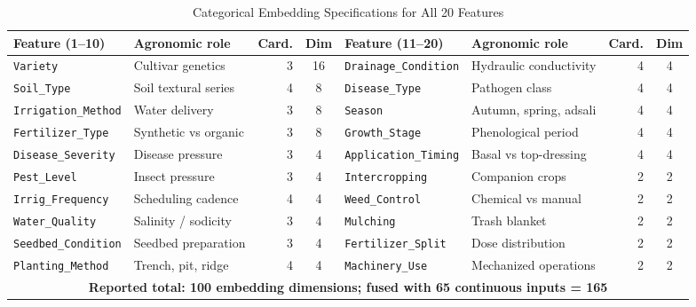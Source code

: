 \documentclass[conference,10pt,letterpaper]{IEEEtran}
\begin{document}
\begin{table}[t]
\caption{Categorical Embedding Specifications for All 20 Features}
\label{tab:embeddings}
\centering
\footnotesize
\setlength{\tabcolsep}{4pt}
\begin{tabular*}{\textwidth}{@{\extracolsep{\fill}}llrc@{\hspace{2em}}llrc@{}}
\toprule
\textbf{Feature (1--10)} & \textbf{Agronomic role} & \textbf{Card.} & \textbf{Dim} &
\textbf{Feature (11--20)} & \textbf{Agronomic role} & \textbf{Card.} & \textbf{Dim} \\
\midrule
\texttt{Variety}            & Cultivar genetics       & 3 & 16 & \texttt{Drainage\_Condition}  & Hydraulic conductivity & 4 & 4 \\
\texttt{Soil\_Type}         & Soil textural series    & 4 & 8  & \texttt{Disease\_Type}        & Pathogen class         & 4 & 4 \\
\texttt{Irrigation\_Method} & Water delivery          & 3 & 8  & \texttt{Season}               & Autumn, spring, adsali & 4 & 4 \\
\texttt{Fertilizer\_Type}   & Synthetic vs organic    & 3 & 8  & \texttt{Growth\_Stage}        & Phenological period    & 4 & 4 \\
\texttt{Disease\_Severity}  & Disease pressure        & 3 & 4  & \texttt{Application\_Timing}  & Basal vs top-dressing  & 4 & 4 \\
\texttt{Pest\_Level}        & Insect pressure         & 3 & 4  & \texttt{Intercropping}        & Companion crops        & 2 & 2 \\
\texttt{Irrig\_Frequency}   & Scheduling cadence      & 4 & 4  & \texttt{Weed\_Control}        & Chemical vs manual     & 2 & 2 \\
\texttt{Water\_Quality}     & Salinity / sodicity     & 3 & 4  & \texttt{Mulching}             & Trash blanket          & 2 & 2 \\
\texttt{Seedbed\_Condition} & Seedbed preparation     & 3 & 4  & \texttt{Fertilizer\_Split}    & Dose distribution      & 2 & 2 \\
\texttt{Planting\_Method}   & Trench, pit, ridge      & 4 & 4  & \texttt{Machinery\_Use}       & Mechanized operations  & 2 & 2 \\
\midrule
\multicolumn{8}{c}{\textbf{Reported total: 100 embedding dimensions; fused with 65 continuous inputs = 165}} \\
\bottomrule
\end{tabular*}
\end{table}
\end{document}
